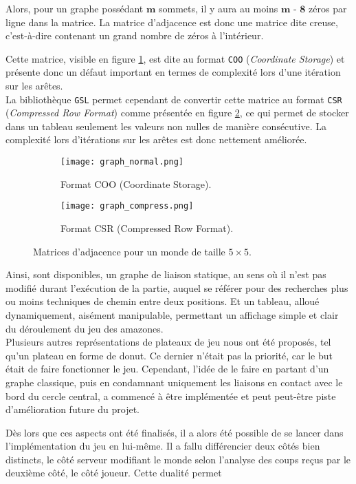 Alors, pour un graphe possédant $\textbf{m}$ sommets, il y aura au moins $ \textbf{m - 8}$ zéros par ligne dans la matrice. La matrice d'adjacence est donc une matrice dite creuse, c'est-à-dire contenant un grand nombre de zéros à l'intérieur.

\medbreak
Cette matrice, visible en figure \ref{subfig:graphe_normal}, est dite au format \texttt{COO} (\textit{Coordinate Storage}) et présente donc un défaut important en termes de complexité lors d'une itération sur les arêtes. \\
La bibliothèque \texttt{GSL} permet cependant de convertir cette matrice au format \texttt{CSR} (\textit{Compressed Row Format}) comme présentée en figure \ref{subfig:graphe_compresse}, ce qui permet de stocker dans un tableau seulement les valeurs non nulles de manière consécutive. La complexité lors d'itérations sur les arêtes est donc nettement améliorée.

\begin{figure}[H]
    \centering
    \begin{subfigure}{0.5\textwidth}
        \centering
        \texttt{[image: graph\_normal.png]}
        \caption{Format COO (Coordinate Storage).}
        \label{subfig:graphe_normal}
    \end{subfigure}
    \hspace{1cm}
    \begin{subfigure}{0.4\textwidth}
        \centering
        \texttt{[image: graph\_compress.png]}
        \caption{Format CSR (Compressed Row Format).}
        \label{subfig:graphe_compresse}
    \end{subfigure}
    \caption{Matrices d'adjacence pour un monde de taille $5\times5$.\protect\footnotemark} 
    \label{fig:matrices_d_adjacence}
\end{figure} \medbreak
{}

Ainsi, sont disponibles, un graphe de liaison statique, au sens où il n'est pas modifié durant l'exécution de la partie, auquel se référer pour des recherches plus ou moins techniques de chemin entre deux positions. Et un tableau, alloué dynamiquement, aisément manipulable, permettant un affichage simple et clair du déroulement du jeu des amazones.\\
Plusieurs autres représentations de plateaux de jeu nous ont été proposés, tel qu'un plateau en forme de donut. Ce dernier n'était pas la priorité, car le but était de faire fonctionner le jeu. Cependant, l'idée de le faire en partant d'un graphe classique, puis en condamnant uniquement les liaisons en contact avec le bord du cercle central, a commencé à être implémentée et peut peut-être piste d'amélioration future du projet.

\medbreak

Dès lors que ces aspects ont été finalisés, il a alors été possible de se lancer dans l'implémentation du jeu en lui-même. Il a fallu différencier deux côtés bien distincts, le côté serveur modifiant le monde selon l'analyse des coups reçus par le deuxième côté, le côté joueur. Cette dualité permet 
